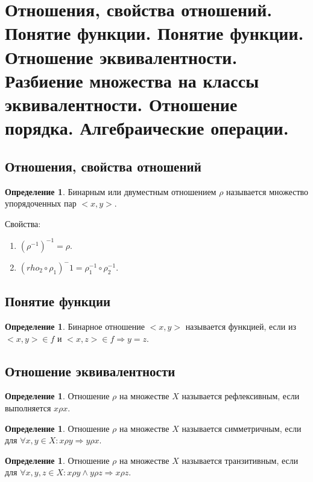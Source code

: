 \documentclass[12pt]{report}
\theoremstyle{definition}
\newtheorem{definition}[theorem]{Определение}
\begin{document}
\section
{
  Отношения, свойства отношений. Понятие функции.
  Понятие функции. Отношение эквивалентности.
  Разбиение множества на классы эквивалентности.
  Отношение порядка. Алгебраические операции.
}

\subsection{Отношения, свойства отношений}

\begin{definition}
Бинарным или двуместным отношением $\rho$ называется множество
упорядоченных пар $<x, y>$.
\end{definition}

Свойства:
\begin{enumerate}
\item $(\rho^{-1})^{-1} = \rho$.
\item $(rho_2 \circ \rho_1)^-1 = \rho_1^{-1} \circ \rho_2^{-1}$.
\end{enumerate}

\subsection{Понятие функции}
\begin{definition}
Бинарное отношение $<x, y>$ называется функцией, если из
$<x, y> \in f$ и $<x, z> \in f \Rightarrow y = z$.
\end{definition}

\subsection{Отношение эквивалентности}
\begin{definition}
Отношение $\rho$ на множестве $X$ называется рефлексивным,
если выполняется $x \rho x$.
\end{definition}

\begin{definition}
Отношение $\rho$ на множестве $X$ называется симметричным,
если для $\forall x, y \in X: x \rho y \Rightarrow y \rho x$.
\end{definition}

\begin{definition}
Отношение $\rho$ на множестве $X$ называется транзитивным,
если для $\forall x, y, z \in X: x \rho y \land y \rho z \Rightarrow x \rho z$.
\end{definition}
\end{document}
